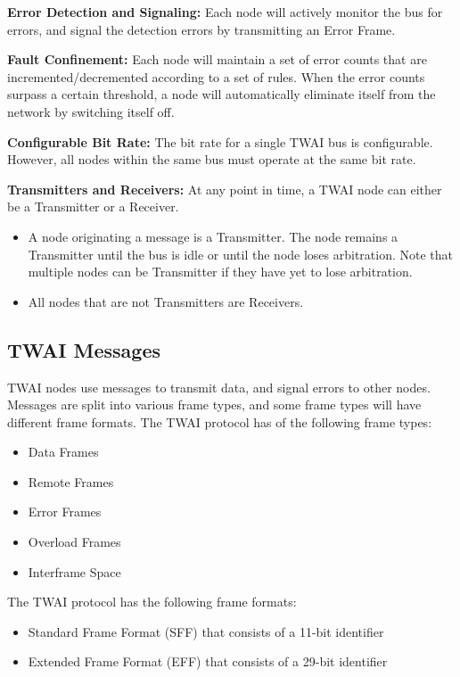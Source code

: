 \documentclass[main\_\_EN.tex]{subfiles}
\begin{document}
{\bfseries Error Detection and Signaling:} Each node will actively monitor the bus for errors, and signal the detection errors by transmitting an Error Frame.

{\bfseries Fault Confinement:} Each node will maintain a set of error counts that are incremented/decremented according to a set of rules. When the error counts surpass a certain threshold, a node will automatically eliminate itself from the network by switching itself off.

{\bfseries Configurable Bit Rate:} The bit rate for a single TWAI bus is configurable. However, all nodes within the same bus must operate at the same bit rate.

{\bfseries Transmitters and Receivers:} At any point in time, a TWAI node can either be a Transmitter or a Receiver.
\begin{itemize}
    \item A node originating a message is a Transmitter. The node remains a Transmitter until the bus is idle or until the node loses arbitration. Note that multiple nodes can be Transmitter if they have yet to lose arbitration.
    \item All nodes that are not Transmitters are Receivers.
\end{itemize}

\subsection{TWAI Messages}
\label{subsubsec:twai-messages}
TWAI nodes use messages to transmit data, and signal errors to other nodes. Messages are split into various frame types, and some frame types will have different frame formats.
The TWAI protocol has of the following frame types:

\begin{itemize}
    \item Data Frames
    \item Remote Frames
    \item Error Frames
    \item Overload Frames
    \item Interframe Space
\end{itemize}

The TWAI protocol has the following frame formats:
\begin{itemize}
    \item Standard Frame Format (SFF) that consists of a 11-bit identifier
    \item Extended Frame Format (EFF) that consists of a 29-bit identifier
\end{itemize}
\end{document}
